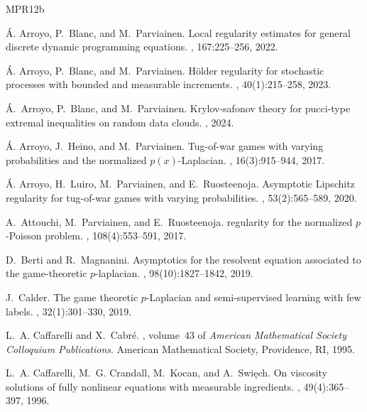 \documentclass[english]{amsart}
\theoremstyle{plain}
\theoremstyle{definition}
\theoremstyle{remark}
\numberwithin{equation}{section}
\begin{document}
\begin{thebibliography}{MPR12b}

\'{A}. Arroyo, P.~Blanc, and M.~Parviainen.
\newblock Local regularity estimates for general discrete dynamic programming
  equations.
, 167:225--256, 2022.

\'{A}. Arroyo, P.~Blanc, and M.~Parviainen.
\newblock H\"{o}lder regularity for stochastic processes with bounded and
  measurable increments.
,
  40(1):215--258, 2023.

{\'A}.~Arroyo, P.~Blanc, and M.~Parviainen.
\newblock Krylov-safonov theory for pucci-type extremal inequalities on random
  data clouds.
, 2024.

\'A. Arroyo, J.~Heino, and M.~Parviainen.
\newblock Tug-of-war games with varying probabilities and the normalized
  {$p(x)$}-{L}aplacian.
, 16(3):915--944, 2017.

\'{A}. Arroyo, H.~Luiro, M.~Parviainen, and E.~Ruosteenoja.
\newblock Asymptotic {L}ipschitz regularity for tug-of-war games with varying
  probabilities.
, 53(2):565--589, 2020.

A.~Attouchi, M.~Parviainen, and E.~Ruosteenoja.
 regularity for the normalized {$p$}-{P}oisson
  problem.
, 108(4):553--591, 2017.

D.~Berti and R.~Magnanini.
\newblock Asymptotics for the resolvent equation associated to the
  game-theoretic {$p$}-laplacian.
, 98(10):1827--1842, 2019.

J.~Calder.
\newblock The game theoretic {$p$}-{L}aplacian and semi-supervised learning
  with few labels.
, 32(1):301--330, 2019.

L.~A. Caffarelli and X.~Cabr\'{e}.
, volume~43 of {\em American
  Mathematical Society Colloquium Publications}.
\newblock American Mathematical Society, Providence, RI, 1995.

L.~A. Caffarelli, M.~G. Crandall, M.~Kocan, and A.~Swi\k{e}ch.
\newblock On viscosity solutions of fully nonlinear equations with measurable
  ingredients.
, 49(4):365--397, 1996.


\end{thebibliography}
\end{document}
